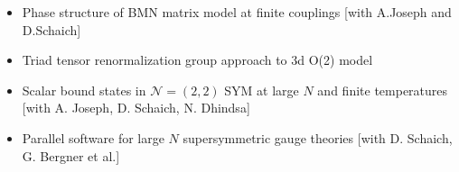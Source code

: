 \renewcommand{\arraystretch}{1.1}

	\begin{itemize}
	 \item Phase structure of BMN matrix model at finite couplings [with A.Joseph and D.Schaich] 
	 \item Triad tensor renormalization group approach to 3d O(2) model
	 \item Scalar bound states in $\mathcal{N}=(2,2)$ SYM at large $N$ and finite temperatures [with A. Joseph, D. Schaich, N. Dhindsa] 
	 \item Parallel software for large $N$ supersymmetric gauge theories [with D. Schaich, G. Bergner et al.] 
	  \end{itemize}

